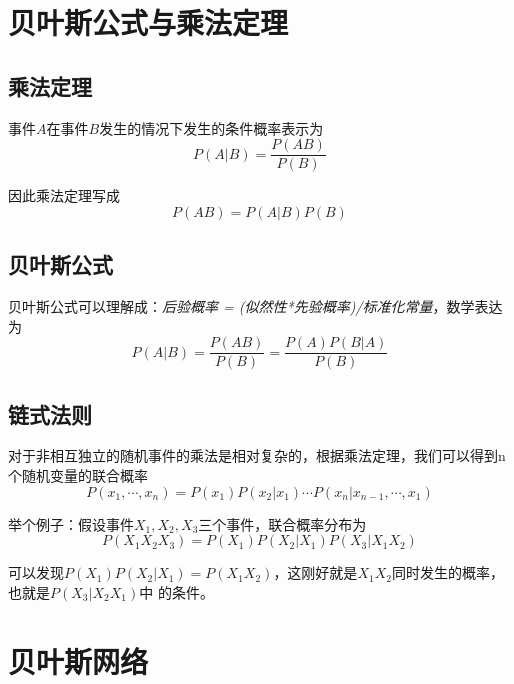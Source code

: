 \section{贝叶斯公式与乘法定理}

\subsection*{乘法定理}

事件$A$在事件$B$发生的情况下发生的条件概率表示为
\begin{equation}
    P(A|B)=\frac{P(AB)}{P(B)}
\end{equation}

因此乘法定理写成
\begin{equation}
    P(AB)=P(A|B)P(B)
\end{equation}

\subsection*{贝叶斯公式}

贝叶斯公式可以理解成：\textsl{后验概率 = (似然性*先验概率)/标准化常量}，数学表达为
\begin{equation}
    P(A|B)=\frac{P(AB)}{P(B)}=\frac{P(A)P(B|A)}{P(B)}
\end{equation}

\subsection*{链式法则}

对于非相互独立的随机事件的乘法是相对复杂的，根据乘法定理，我们可以得到n个随机变量的联合概率
\begin{equation}
    P(x_1,\cdots,x_n)=P(x_1)P(x_2|x_1)\cdots P(x_n|x_{n-1},\cdots,x_1)
\end{equation}

举个例子：假设事件$X_1,X_2,X_3$三个事件，联合概率分布为
\begin{equation}
    P(X_1X_2X_3)=P(X_1)P(X_2|X_1)P(X_3|X_1X_2)
\end{equation}

可以发现$P(X_1)P(X_2|X_1)=P(X_1X_2)$，这刚好就是$X_1X_2$同时发生的概率，也就是$P(X_3|X_2X_1)$中
的条件。

\section{贝叶斯网络}

